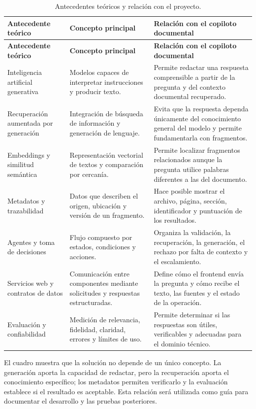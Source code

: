 \renewcommand{\arraystretch}{1.25}
\begin{longtable}{p{3.4cm}p{5.0cm}p{5.5cm}}
\caption{Antecedentes teóricos y relación con el proyecto.}\label{tab:antecedentes-teoricos}\\\toprule
\textbf{Antecedente teórico} & \textbf{Concepto principal} & \textbf{Relación con el copiloto documental}\\\midrule
\endfirsthead
\toprule
\textbf{Antecedente teórico} & \textbf{Concepto principal} & \textbf{Relación con el copiloto documental}\\\midrule
\endhead
\bottomrule
\endfoot
Inteligencia artificial generativa & Modelos capaces de interpretar instrucciones y producir texto. & Permite redactar una respuesta comprensible a partir de la pregunta y del contexto documental recuperado.\\
Recuperación aumentada por generación & Integración de búsqueda de información y generación de lenguaje. & Evita que la respuesta dependa únicamente del conocimiento general del modelo y permite fundamentarla con fragmentos.\\
Embeddings y similitud semántica & Representación vectorial de textos y comparación por cercanía. & Permite localizar fragmentos relacionados aunque la pregunta utilice palabras diferentes a las del documento.\\
Metadatos y trazabilidad & Datos que describen el origen, ubicación y versión de un fragmento. & Hace posible mostrar el archivo, página, sección, identificador y puntuación de los resultados.\\
Agentes y toma de decisiones & Flujo compuesto por estados, condiciones y acciones. & Organiza la validación, la recuperación, la generación, el rechazo por falta de contexto y el escalamiento.\\
Servicios web y contratos de datos & Comunicación entre componentes mediante solicitudes y respuestas estructuradas. & Define cómo el frontend envía la pregunta y cómo recibe el texto, las fuentes y el estado de la operación.\\
Evaluación y confiabilidad & Medición de relevancia, fidelidad, claridad, errores y límites de uso. & Permite determinar si las respuestas son útiles, verificables y adecuadas para el dominio técnico.\\
\end{longtable}

El cuadro muestra que la solución no depende de un único concepto. La generación aporta la capacidad de redactar, pero la recuperación aporta el conocimiento específico; los metadatos permiten verificarlo y la evaluación establece si el resultado es aceptable. Esta relación será utilizada como guía para documentar el desarrollo y las pruebas posteriores.

